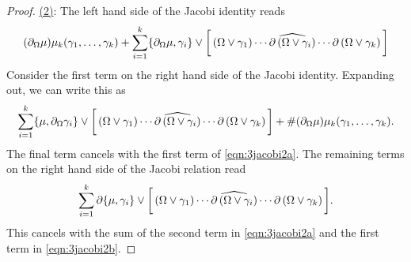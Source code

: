 \documentclass[11pt]{amsart}
\numberwithin{equation}{section}
\def\div{\partial_\Omega}
\begin{document}
\begin{proof}
\ul{(2)}: 
The left hand side of the Jacobi identity reads
\begin{equation}\label{eqn:3jacobi2a}
(\div \mu) \mu_k (\gamma_1,\ldots, \gamma_k) + \sum_{i=1}^k \{\div \mu, \gamma_i\} \vee \bigg[\left(\Omega \vee \gamma_1\right) \cdots \Hat{\partial \left(\Omega \vee \gamma_i\right)} \cdots \partial \left(\Omega \vee \gamma_k\right) \bigg]
\end{equation}
Consider the first term on the right hand side of the Jacobi identity. 
Expanding out, we can write this as
\begin{equation}\label{eqn:3jacobi2b}
\sum_{i=1}^k \{\mu, \div \gamma_i\} \vee \bigg[\left(\Omega \vee \gamma_1\right) \cdots \Hat{\partial \left(\Omega \vee \gamma_i\right)} \cdots \partial \left(\Omega \vee \gamma_k\right) \bigg] + \# (\div \mu) \mu_k(\gamma_1,\ldots, \gamma_k) .
\end{equation}
The final term cancels with the first term of \eqref{eqn:3jacobi2a}. 
The remaining terms on the right hand side of the Jacobi relation read
\[
\sum_{i=1}^k \partial \{\mu, \gamma_i\} \vee \bigg[\left(\Omega \vee \gamma_1\right) \cdots \Hat{\partial \left(\Omega \vee \gamma_i\right)} \cdots \partial \left(\Omega \vee \gamma_k\right) \bigg] .
\]
This cancels with the sum of the second term in \eqref{eqn:3jacobi2a} and the first term in \eqref{eqn:3jacobi2b}.
\end{proof}
\end{document}
